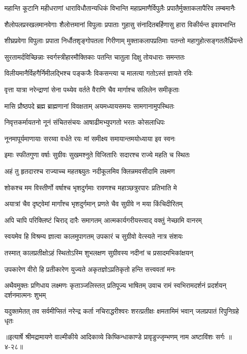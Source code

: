 \twolineshloka
{महान्ति कूटानि महीधराणां धाराविधौतान्यधिकं विभान्ति}
{महाप्रमाणैर्विपुलैः प्रपातैर्मुक्ताकलापैरिव लम्बमानैः} %

\twolineshloka
{शैलोपलप्रस्खलमानवेगाः शैलोत्तमानां विपुलाः प्रपाताः}
{गुहासु संनादितबर्हिणासु हारा विकीर्यन्त इवावभान्ति} %

\twolineshloka
{शीघ्रप्रवेगा विपुलाः प्रपाता निर्धौतशृङ्गोपतला गिरीणाम्}
{मुक्ताकलापप्रतिमाः पतन्तो महागुहोत्सङ्गतलैर्ध्रियन्ते} %

\twolineshloka
{सुरतामर्दविच्छिन्नाः स्वर्गस्त्रीहारमौक्तिकाः}
{पतन्ति चातुला दिक्षु तोयधाराः समन्ततः} %

\twolineshloka
{विलीयमानैर्विहगैर्निमीलद्भिश्च पङ्कजैः}
{विकसन्त्या च मालत्या गतोऽस्तं ज्ञायते रविः} %

\twolineshloka
{वृत्ता यात्रा नरेन्द्राणां सेना पथ्येव वर्तते}
{वैराणि चैव मार्गाश्च सलिलेन समीकृताः} %

\twolineshloka
{मासि प्रौष्ठपदे ब्रह्म ब्राह्मणानां विवक्षताम्}
{अयमध्यायसमयः सामगानामुपस्थितः} %

\twolineshloka
{निवृत्तकर्मायतनो नूनं संचितसंचयः}
{आषाढीमभ्युपगतो भरतः कोसलाधिपः} %

\twolineshloka
{नूनमापूर्यमाणायाः सरय्वा वर्धते रयः}
{मां समीक्ष्य समायान्तमयोध्याया इव स्वनः} %

\twolineshloka
{इमाः स्फीतगुणा वर्षाः सुग्रीवः सुखमश्नुते}
{विजितारिः सदारश्च राज्ये महति च स्थितः} %

\twolineshloka
{अहं तु हृतदारश्च राज्याच्च महतश्च्युतः}
{नदीकूलमिव क्लिन्नमवसीदामि लक्ष्मण} %

\twolineshloka
{शोकश्च मम विस्तीर्णो वर्षाश्च भृशदुर्गमाः}
{रावणश्च महाञ्छत्रुरपारः प्रतिभाति मे} %

\twolineshloka
{अयात्रां चैव दृष्ट्वेमां मार्गांश्च भृशदुर्गमान्}
{प्रणते चैव सुग्रीवे न मया किंचिदीरितम्} %

\twolineshloka
{अपि चापि परिक्लिष्टं चिराद् दारैः समागतम्}
{आत्मकार्यगरीयस्त्वाद् वक्तुं नेच्छामि वानरम्} %

\twolineshloka
{स्वयमेव हि विश्रम्य ज्ञात्वा कालमुपागतम्}
{उपकारं च सुग्रीवो वेत्स्यते नात्र संशयः} %

\twolineshloka
{तस्मात् कालप्रतीक्षोऽहं स्थितोऽस्मि शुभलक्षण}
{सुग्रीवस्य नदीनां च प्रसादमभिकांक्षयन्} %

\twolineshloka
{उपकारेण वीरो हि प्रतीकारेण युज्यते}
{अकृतज्ञोऽप्रतिकृतो हन्ति सत्त्ववतां मनः} %

\twolineshloka
{अथैवमुक्तः प्रणिधाय लक्ष्मणः कृताञ्जलिस्तत् प्रतिपूज्य भाषितम्}
{उवाच रामं स्वभिरामदर्शनं प्रदर्शयन् दर्शनमात्मनः शुभम्} %

\twolineshloka
{यदुक्तमेतत् तव सर्वमीप्सितं नरेन्द्र कर्ता नचिराद्धरीश्वरः}
{शरत्प्रतीक्षः क्षमतामिमं भवान् जलप्रपातं रिपुनिग्रहे धृतः} %


॥इत्यार्षे श्रीमद्रामायणे वाल्मीकीये आदिकाव्ये किष्किन्धाकाण्डे प्रावृडुज्जृम्भणम् नाम अष्टाविंशः सर्गः ॥४-२८॥
